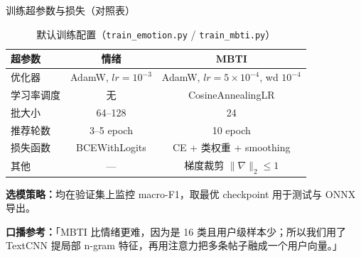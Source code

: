 \begin{frame}{训练超参数与损失（对照表）}
    \footnotesize
    \begin{table}
        \centering
        \caption{默认训练配置（\texttt{train\_emotion.py} / \texttt{train\_mbti.py}）}
        \begin{tabular}{lcc}
            \toprule
            超参数 & 情绪 & MBTI \\
            \midrule
            优化器 & AdamW, $lr=10^{-3}$ & AdamW, $lr=5\times 10^{-4}$, wd $10^{-4}$ \\
            学习率调度 & 无 & CosineAnnealingLR \\
            批大小 & 64--128 & 24 \\
            推荐轮数 & 3--5 epoch & 10 epoch \\
            损失函数 & BCEWithLogits & CE + 类权重 + smoothing \\
            其他 & — & 梯度裁剪 $\|\nabla\|_2 \leq 1$ \\
            \bottomrule
        \end{tabular}
    \end{table}

    \vspace{0.4em}
    \textbf{选模策略：}均在验证集上监控 macro-F1，取最优 checkpoint 用于测试与 ONNX 导出。

    \vspace{0.3em}
    \textbf{口播参考：}「MBTI 比情绪更难，因为是 16 类且用户级样本少；所以我们用了 TextCNN 提局部 n-gram 特征，再用注意力把多条帖子融成一个用户向量。」
\end{frame}

